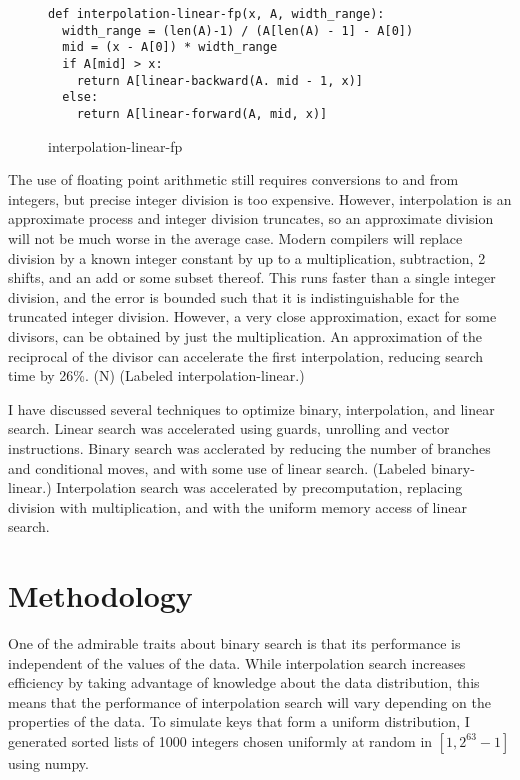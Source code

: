 \documentclass{article}
\begin{document}
\begin{figure}
\begin{verbatim}
def interpolation-linear-fp(x, A, width_range):
  width_range = (len(A)-1) / (A[len(A) - 1] - A[0])
  mid = (x - A[0]) * width_range
  if A[mid] > x:
    return A[linear-backward(A. mid - 1, x)]
  else:
    return A[linear-forward(A, mid, x)]
\end{verbatim}
\caption{interpolation-linear-fp}
\end{figure}

The use of floating point arithmetic still requires conversions to and from integers, but precise integer division is too expensive. However, interpolation is an approximate process and integer division truncates, so an approximate division will not be much worse in the average case. Modern compilers will replace division by a known integer constant by up to a multiplication, subtraction, 2 shifts, and an add or some subset thereof. This runs faster than a single integer division, and the error is bounded such that it is indistinguishable for the truncated integer division. However, a very close approximation, exact for some divisors, can be obtained by just the multiplication. An approximation of the reciprocal of the divisor can accelerate the first interpolation, reducing search time by 26\%. (N) (Labeled interpolation-linear.) 

I have discussed several techniques to optimize  binary, interpolation, and linear search. Linear search was accelerated using guards, unrolling and vector instructions. Binary search was acclerated by reducing the number of branches and conditional moves, and with some use of linear search. (Labeled binary-linear.)  Interpolation search was accelerated by precomputation, replacing division with multiplication, and with the uniform memory access of linear search.

\section{Methodology}
One of the admirable traits about binary search is that its performance is independent of the values of the data. While interpolation search increases efficiency by taking advantage of knowledge about the data distribution, this means that the performance of interpolation search will vary depending on the properties of the data. To simulate keys that form a uniform distribution, I generated sorted lists of 1000 integers chosen uniformly at random in $[1, 2^{63} - 1]$ using numpy.
\end{document}
